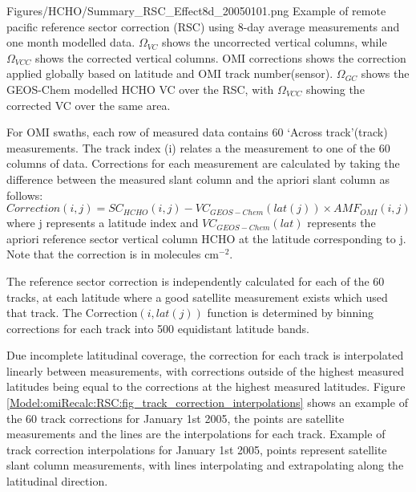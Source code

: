     {Figures/HCHO/Summary_RSC_Effect8d_20050101.png}
    {%
      Example of remote pacific reference sector correction (RSC) using 8-day average measurements and one month modelled data.
      $\Omega_{VC}$ shows the uncorrected vertical columns, while $\Omega_{VCC}$ shows the corrected vertical columns.
      OMI corrections shows the correction applied globally based on latitude and OMI track number(sensor).
      $\Omega_{GC}$ shows the GEOS-Chem modelled HCHO VC over the RSC, with $\Omega_{VCC}$ showing the corrected VC over the same area.
    }
    {\label{Model:omiRecalc:RSC:fig_RSCeg}}
    
    For OMI swaths, each row of measured data contains 60 `Across track'(track) measurements.
    The track index (i) relates a the measurement to one of the 60 columns of data.
    Corrections for each measurement are calculated by taking the difference between the measured slant column and the apriori slant column as follows:
    \begin{equation} \label{Model:omiRecalc:eqn_RSC}
      Correction(i,j) = SC_{HCHO}(i,j) - VC_{GEOS-Chem}(lat(j)) \times {AMF_{OMI}}(i,j)
    \end{equation}
    where j represents a latitude index and $VC_{GEOS-Chem}(lat)$ represents the apriori reference sector vertical column HCHO at the latitude corresponding to j.
    Note that the correction is in molecules cm$^{-2}$.
    
    The reference sector correction is independently calculated for each of the 60 tracks, at each latitude where a good satellite measurement exists which used that track.
    The Correction$(i,lat(j))$ function is determined by binning corrections for each track into 500 equidistant latitude bands. 
    
    Due incomplete latitudinal coverage, the correction for each track is interpolated linearly between measurements, with corrections outside of the highest measured latitudes being equal to the corrections at the highest measured latitudes.
    Figure \ref{Model:omiRecalc:RSC:fig_track_correction_interpolations} shows an example of the 60 track corrections for January 1st 2005, the points are satellite measurements and the lines are the interpolations for each track.
      {Example of track correction interpolations for January 1st 2005, points represent satellite slant column measurements, with lines interpolating and extrapolating along the latitudinal direction.}
      {\label{Model:omiRecalc:RSC:fig_track_correction_interpolations}}
    
